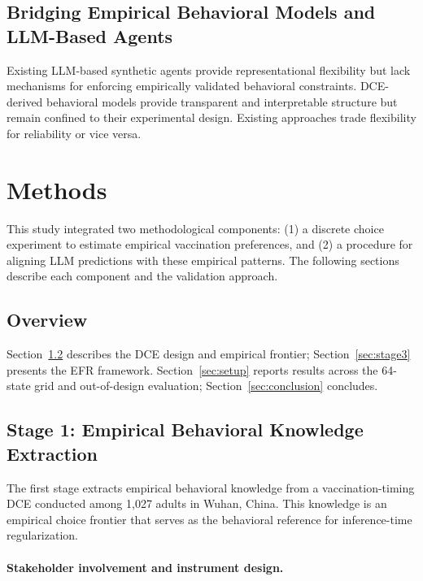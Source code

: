 \documentclass[11pt]{article}
\begin{document}
\subsection{Bridging Empirical Behavioral Models and LLM-Based Agents}

Existing LLM-based synthetic agents provide representational flexibility but lack mechanisms for enforcing empirically validated behavioral constraints\citep{li2026position, tornberg2025validation}. DCE-derived behavioral models provide transparent and interpretable structure but remain confined to their experimental design. Existing approaches trade flexibility for reliability or vice versa.

\section{Methods}
\label{sec:methods}

This study integrated two methodological components: (1) a discrete choice experiment to estimate empirical vaccination preferences, and (2) a procedure for aligning LLM predictions with these empirical patterns. The following sections describe each component and the validation approach.

\subsection{Overview}

Section~\ref{sec:stage1} describes the DCE design and empirical frontier; Section~\ref{sec:stage3} presents the EFR framework. Section~\ref{sec:setup} reports results across the 64-state grid and out-of-design evaluation; Section~\ref{sec:conclusion} concludes.

\subsection{Stage 1: Empirical Behavioral Knowledge Extraction}
\label{sec:stage1}

The first stage extracts empirical behavioral knowledge from a vaccination-timing DCE conducted among 1,027 adults in Wuhan, China. This knowledge is an empirical choice frontier that serves as the behavioral reference for inference-time regularization.

\paragraph{Stakeholder involvement and instrument design.}
\end{document}

